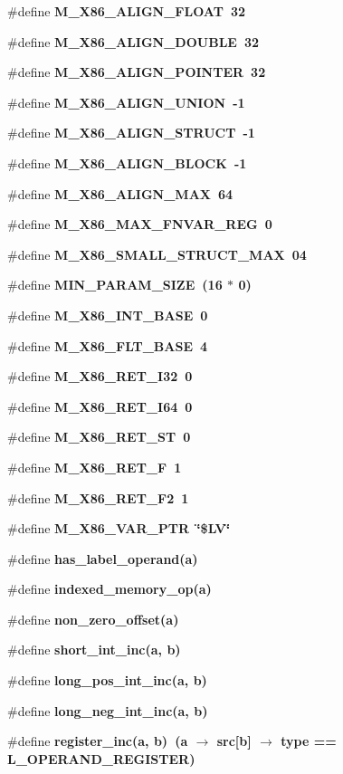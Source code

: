 \begin{CompactItemize}
\item 
\#define \bf{M\_\-X86\_\-ALIGN\_\-FLOAT}~32
\item 
\#define \bf{M\_\-X86\_\-ALIGN\_\-DOUBLE}~32
\item 
\#define \bf{M\_\-X86\_\-ALIGN\_\-POINTER}~32
\item 
\#define \bf{M\_\-X86\_\-ALIGN\_\-UNION}~-1
\item 
\#define \bf{M\_\-X86\_\-ALIGN\_\-STRUCT}~-1
\item 
\#define \bf{M\_\-X86\_\-ALIGN\_\-BLOCK}~-1
\item 
\#define \bf{M\_\-X86\_\-ALIGN\_\-MAX}~64
\item 
\#define \bf{M\_\-X86\_\-MAX\_\-FNVAR\_\-REG}~0
\item 
\#define \bf{M\_\-X86\_\-SMALL\_\-STRUCT\_\-MAX}~04
\item 
\#define \bf{MIN\_\-PARAM\_\-SIZE}~(16 $\ast$ 0)
\item 
\#define \bf{M\_\-X86\_\-INT\_\-BASE}~0
\item 
\#define \bf{M\_\-X86\_\-FLT\_\-BASE}~4
\item 
\#define \bf{M\_\-X86\_\-RET\_\-I32}~0
\item 
\#define \bf{M\_\-X86\_\-RET\_\-I64}~0
\item 
\#define \bf{M\_\-X86\_\-RET\_\-ST}~0
\item 
\#define \bf{M\_\-X86\_\-RET\_\-F}~1
\item 
\#define \bf{M\_\-X86\_\-RET\_\-F2}~1
\item 
\#define \bf{M\_\-X86\_\-VAR\_\-PTR}~\char`\"{}\$LV\char`\"{}
\item 
\#define \bf{has\_\-label\_\-operand}(a)
\item 
\#define \bf{indexed\_\-memory\_\-op}(a)
\item 
\#define \bf{non\_\-zero\_\-offset}(a)
\item 
\#define \bf{short\_\-int\_\-inc}(a, b)
\item 
\#define \bf{long\_\-pos\_\-int\_\-inc}(a, b)
\item 
\#define \bf{long\_\-neg\_\-int\_\-inc}(a, b)
\item 
\#define \bf{register\_\-inc}(a, b)~(a $\rightarrow$ src[b] $\rightarrow$ type == L\_\-OPERAND\_\-REGISTER)
\end{CompactItemize}
